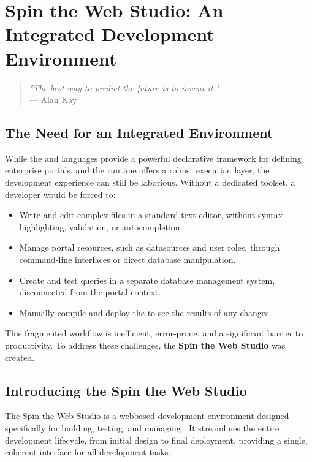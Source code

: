 \chapter{Spin the Web Studio: An Integrated Development Environment}
\label{chap:studio}

\begin{quote}
\textit{"The best way to predict the future is to invent it."} \\
— Alan Kay
\end{quote}

\section{The Need for an Integrated Environment}
\label{sec:studio-need}

While the \wbdl{} and \wbpl{} languages provide a powerful declarative framework for defining enterprise portals, and the \webspinner{} runtime offers a robust execution layer, the development experience can still be laborious. Without a dedicated toolset, a developer would be forced to:

\begin{itemize}
    \item Write and edit complex \wbdl{} files in a standard text editor, without syntax highlighting, validation, or autocompletion.
    \item Manage portal resources, such as datasources and user roles, through command-line interfaces or direct database manipulation.
    \item Create and test \wbpl{} queries in a separate database management system, disconnected from the portal context.
    \item Manually compile and deploy the \webbase{} to see the results of any changes.
\end{itemize}

This fragmented workflow is inefficient, error-prone, and a significant barrier to productivity. To address these challenges, the \textbf{Spin the Web Studio} was created.

\section{Introducing the Spin the Web Studio}
\label{sec:studio-intro}

The Spin the Web Studio is a webbased development environment designed specifically for building, testing, and managing . It streamlines the entire development lifecycle, from initial design to final deployment, providing a single, coherent interface for all development tasks.

